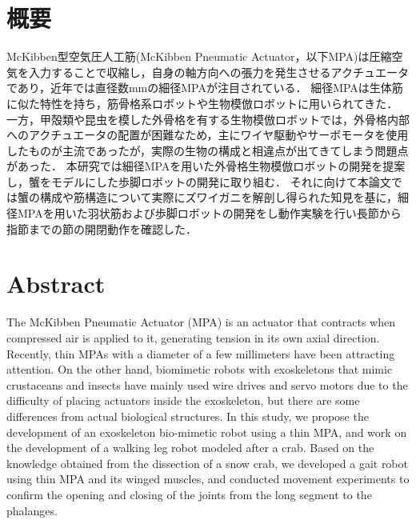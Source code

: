 \newpage
\section*{概要}
McKibben型空気圧人工筋(McKibben Pneumatic Actuator，以下MPA)は圧縮空気を入力することで収縮し，自身の軸方向への張力を発生させるアクチュエータであり，近年では直径数mmの細径MPAが注目されている．
細径MPAは生体筋に似た特性を持ち，筋骨格系ロボットや生物模倣ロボットに用いられてきた．
一方，甲殻類や昆虫を模した外骨格を有する生物模倣ロボットでは，外骨格内部へのアクチュエータの配置が困難なため，主にワイヤ駆動やサーボモータを使用したものが主流であったが，実際の生物の構成と相違点が出てきてしまう問題点があった．
本研究では細径MPAを用いた外骨格生物模倣ロボットの開発を提案し，蟹をモデルにした歩脚ロボットの開発に取り組む．
それに向けて本論文では蟹の構成や筋構造について実際にズワイガニを解剖し得られた知見を基に，細径MPAを用いた羽状筋および歩脚ロボットの開発をし動作実験を行い長節から指節までの節の開閉動作を確認した．
\newpage
\section*{Abstract}
The McKibben Pneumatic Actuator (MPA) is an actuator that contracts when compressed air is applied to it, generating tension in its own axial direction.
Recently, thin MPAs with a diameter of a few millimeters have been attracting attention.
On the other hand, biomimetic robots with exoskeletons that mimic crustaceans and insects have mainly used wire drives and servo motors due to the difficulty of placing actuators inside the exoskeleton, but there are some differences from actual biological structures.
In this study, we propose the development of an exoskeleton bio-mimetic robot using a thin MPA, and work on the development of a walking leg robot modeled after a crab.
Based on the knowledge obtained from the dissection of a snow crab, we developed a gait robot using thin MPA and its winged muscles, and conducted movement experiments to confirm the opening and closing of the joints from the long segment to the phalanges.